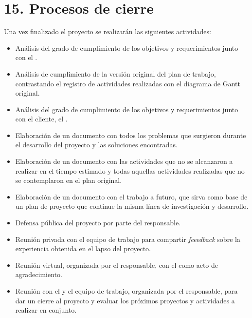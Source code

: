 \documentclass[
11pt, %
codirector, %
]{charter}
\begin{document}
\section{15. Procesos de cierre}
\label{sec:cierre}

Una vez finalizado el proyecto se realizarán las siguientes actividades:
\begin{itemize}
	\item Análisis del grado de cumplimiento de los objetivos y requerimientos junto con el \supname{}.
	\item Análisis de cumplimiento de la versión original del plan de trabajo, contrastando el registro de actividades realizadas con el diagrama de Gantt original.
	\item Análisis del grado de cumplimiento de los objetivos y requerimientos junto con el cliente, el \clientename{}.
	\item Elaboración de un documento con todos los problemas que surgieron durante el desarrollo del proyecto y las soluciones encontradas.
	\item Elaboración de un documento con las actividades que no se alcanzaron a realizar en el tiempo estimado y todas aquellas actividades realizadas que no se contemplaron en el plan original.
	\item Elaboración de un documento con el trabajo a futuro, que sirva como base de un plan de proyecto que continue la misma línea de investigación y desarrollo.
	\item Defensa pública del proyecto por parte del responsable.
	\item Reunión privada con el equipo de trabajo para compartir \textit{feeedback} sobre la experiencia obtenida en el lapso del proyecto.
	\item Reunión virtual, organizada por el responsable, con el \supname{} como acto de agradecimiento.
	\item Reunión con el \clientename{} y el equipo de trabajo, organizada por el responsable, para dar un cierre al proyecto y evaluar los próximos proyectos y actividades a realizar en conjunto.
\end{itemize}
\end{document}
